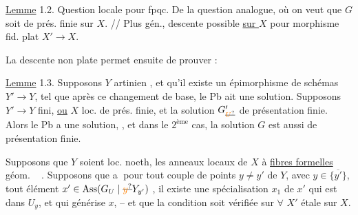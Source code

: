 \uline{Lemme} 1.2. Question locale  pour fpqc. De  la
question analogue, où on veut que $G$ soit  de
prés. finie sur $X$. // Plus gén., descente possible \uline{sur $X$} pour morphisme fid. plat  $X'\to X$.

La descente non plate  permet ensuite de prouver :

\uline{Lemme} 1.3. Supposons $Y$ artinien ,  et qu'il existe un
épimorphisme  de schémas $Y'\to Y$, tel que après ce
changement de base, le Pb ait une solution. Supposons
$Y'\to Y$ fini, \uline{ou} $X$ loc. de prés. finie, et la solution
$G'_{\deleted{\unsure{U}}}$ de présentation finie. Alors le Pb a une solution,
, et dans le $2^{\text{ème}}$ cas, la solution $G$ est aussi
de présentation finie.


\noindent{}\quad{}
Supposons que   $Y$  soient loc. noeth,
les anneaux locaux de $X$ à \uline{fibres formelles} géom. \  .
Supposons que \textcircled{a} pour tout couple de points $y\ne y'$ de $Y$, avec $y\in\overline{\{y'\}}$,
 tout élément   $x'\in\operatorname{Ass}(G_U\mid\deleted{\unsure{y}}Y_{y'})$ , il
existe une spécialisation $x_1$ de $x'$  qui est dans $U_y$,
et qui générise $x$, -- et que la  condition soit vérifiée sur $\forall$ $X'$ étale sur $X$.


